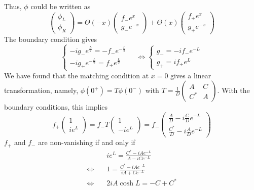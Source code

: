 Thus, $\phi$ could be written as
\begin{equation}
\begin{pmatrix} \phi_L \\ \phi_R \end{pmatrix} = 
\Theta(-x) \begin{pmatrix} f_- e^x  \\ g_-  e^{-x} \end{pmatrix} + 
\Theta(x) \begin{pmatrix} f_+ e^x  \\ g_+  e^{-x} \end{pmatrix}
\end{equation}
The boundary condition gives
\begin{equation}
\begin{cases}
-i g_- e^{\frac{L}{2}} = - f_- e^{-\frac{L}{2}} \\
-ig_+e^{-\frac{L}{2}} = f_+ e^{\frac{L}{2}}
\end{cases} \quad \Leftrightarrow
\begin{cases}
g_- = -i f_- e^{-L} \\
g_+ = i f_+ e^L
\end{cases}
\end{equation}
We have found that the matching condition at $x=0$ gives a linear transformation, namely, $\phi(0^+) = T\phi(0^-)$ with $T = \frac{1}{D}\begin{pmatrix} A & C \\ C^* & A \end{pmatrix}$. 
With the boundary conditions, this implies
\begin{equation}
f_+ \begin{pmatrix} 1 \\ ie^L \end{pmatrix}
= f_- T \begin{pmatrix} 1 \\ -ie^L \end{pmatrix}
= f_- \begin{pmatrix} \frac{A}{D} - i\frac{C}{D} e^{-L}  \\
\frac{C^*}{D} - i \frac{A}{D} e^{-L} \end{pmatrix}
\end{equation}
$f_+$ and $f_-$ are non-vanishing if and only if 
\begin{equation}
\begin{split}
& ie^L = \frac{C^* - iA e^{-L}}{A - iC e^{-L}} \\
\Leftrightarrow \quad & 1 = \frac{C^* - iA e^{-L}}{iA + C e^{-L}} \\
\Leftrightarrow \quad & 2i A \cosh L = -C + C^*
\end{split}
\end{equation}
